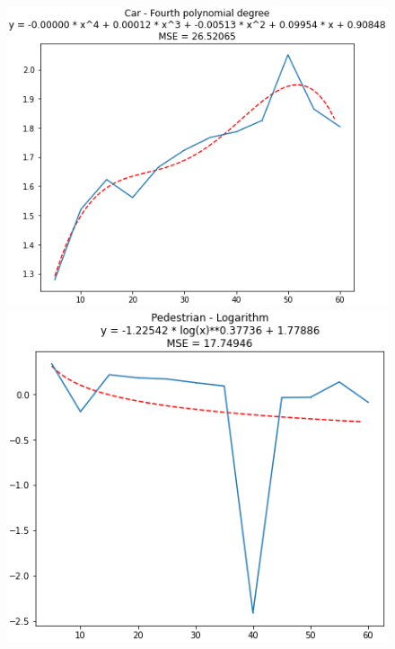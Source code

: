 \begin{figure}[H]
	\begin{minipage}{0.32\textwidth}
		\centering
		\includegraphics[width=1\linewidth]{Book/figures/6_approx_distancia/rectification2_lidar_car.png}
	\end{minipage}\hfill
	\begin{minipage}{0.32\textwidth}
		\centering
		\includegraphics[width=1\linewidth]{Book/figures/6_approx_distancia/rectification2_lidar_pedestrian.png}
	\end{minipage}\hfill

\end{figure}
